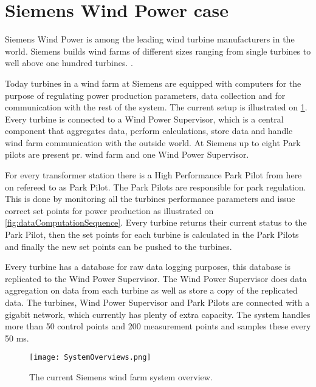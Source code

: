 \section{Siemens Wind Power case}


\label{sec:SiemensCase}
Siemens Wind Power is among the leading wind turbine manufacturers in the world. Siemens builds wind farms of different sizes ranging from single turbines to well above one hundred turbines. \cite{simensOffShoreProjects, simensOnShoreProjects}.

Today turbines in a wind farm at Siemens are equipped with computers for the purpose of regulating power production parameters, data collection and for communication with the rest of the system. The current setup is illustrated on \cref{fig:currentSiemensSetup}. Every turbine is connected to a Wind Power Supervisor, which is a central component that aggregates data, perform calculations, store data and handle wind farm communication with the outside world. At Siemens up to eight Park pilots are present pr. wind farm and one Wind Power Supervisor.

For every transformer station there is a High Performance Park Pilot from here on refereed to as Park Pilot. The Park Pilots are responsible for park regulation. This is done by monitoring all the turbines performance parameters and issue correct set points for power production as illustrated on \cref{fig:dataComputationSequence}. Every turbine returns their current status to the Park Pilot, then the set points for each turbine is calculated in the Park Pilots and finally the new set points can be pushed to the turbines. 

Every turbine has a database for raw data logging purposes, this database is replicated to the Wind Power Supervisor.
The Wind Power Supervisor does 
data aggregation on data from each turbine as well as store a copy of the replicated data.
The turbines, Wind Power Supervisor and Park Pilots are connected with a gigabit network, which currently has plenty of extra capacity.
The system handles more than 50 control points and 200 measurement points and samples these every 50 ms.

\begin{figure}
	\centering
	\texttt{[image: SystemOverviews.png]} 
	\caption[The current Siemens wind farm system overview]{
		\label{fig:currentSiemensSetup} 
		\footnotesize{%
			The current Siemens wind farm system overview.
		}
	}
\end{figure}

